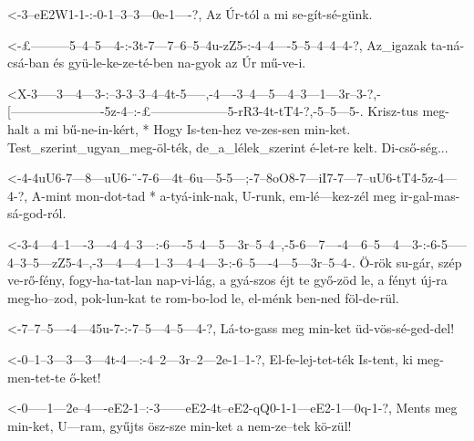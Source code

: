   {<-3--eE2W1-1-:-0-1--3--3---0e-1----?,}
  {  Az Úr-tól    a mi se-gít-sé-günk.}


  {<-£---------5--4--5---4-:-3t-7---7--6--5--4u-zZ5-:-4--4----5--5--4--4--4-?,}
  {  Az_igazak ta-ná-csá-ban és gyü-le-ke-ze-té-ben   na-gyok az Úr mű-ve-i.}

  {<X-3-----3---4---3-:--3-3--3--4--4t-5-----,-4----3--4---5---4--3---1---3r--3-?,-[----------------------5z-4--:-£------------------5-rR3-4t-tT4-?,-5--5---5-.}
  {   Krisz-tus meg-halt a mi bű-ne-in-kért, * Hogy Is-ten-hez ve-zes-sen min-ket. Test_szerint_ugyan_meg-öl-ték, de_a_lélek_szerint é-let-re kelt.  Di-cső-ség...}

  {<-4-4uU6-7---8---uU6-¨-7-6---4t--6u---5-5---;-7--8oO8-7---iI7-7---7--uU6-tT4-5z-4---4-?,}
  {  A-mint mon-dot-tad * a-tyá-ink-nak, U-runk, em-lé---kez-zél meg ir-gal-mas-sá-god-ról.}



  {<-3-4---4--1----3----4--4--3---:-6----5--4---5---3r--5--4--,-5-6---7----4---6--5---4---3-:-6-5-----4--3--5---zZ5-4--,-3---4---4---1--3---4--4---3-:-6--5----4---5---3r--5--4-.}
  {  Ö-rök su-gár, szép ve-rő-fény, fogy-ha-tat-lan nap-vi-lág, a gyá-szos éjt te győ-zöd le, a fényt új-ra meg-ho--zod, pok-lun-kat te rom-bo-lod le, el-ménk ben-ned föl-de-rül.}

  {<-7--7--5----4---45u-7-:-7--5---4--5---4-?,}
  {  Lá-to-gass meg min-ket üd-vös-sé-ged-del!}

  {<-0--1--3---3---3---4t-4---:-4--2---3r--2---2e-1--1-?,}
  {  El-fe-lej-tet-ték Is-tent, ki meg-men-tet-te ő-ket!}

  {<-0-----1---2e--4----eE2-1--:-3------eE2-4t--eE2-qQ0-1-1---eE2-1---0q-1-?,}
  {  Ments meg min-ket, U---ram, gyűjts ösz-sze min-ket a nem-ze--tek kö-zül!}

